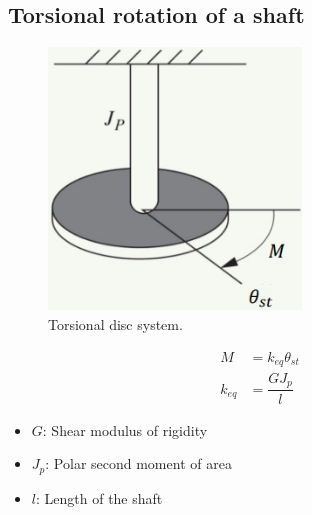 \documentclass[class=report, crop=false, 12pt,a4paper]{standalone}
\begin{document}
\subsection{Torsional rotation of a shaft}
\begin{figure}[H]
    \centering
    \includegraphics[width = 0.6\textwidth]{../img/diagram20.jpg}
    \caption{Torsional disc system.}
\end{figure}
\begin{align}
    M &= k_{eq} \theta_{st}\\
    k_{eq} &= \dfrac{GJ_p}{l}
\end{align}
\begin{itemize}
    \item $G$: Shear modulus of rigidity
    \item $J_p$: Polar second moment of area
    \item $l$: Length of the shaft
\end{itemize}
\end{document}
